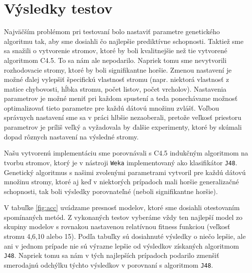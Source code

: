 \section{Výsledky testov}\label{kap5:Results}
Najväčším problémom pri testovaní bolo nastaviť parametre genetického algoritmu tak, aby sme dosiahli čo najlepšie prediktívne schopnosti. Taktiež sme sa snažili o vytvorenie stromov, ktoré by boli kvalitnejšie než tie vytvorené algoritmom C4.5. To sa nám ale nepodarilo. Napriek tomu sme nevytvorili rozhodovacie stromy, ktoré by boli signifikantne horšie. Zmenou nastavení je možné ďalej vylepšiť špecifickú vlastnosť stromu (napr. niektorá vlastnosť z matice chybovosti, hĺbka stromu, počet listov, počet vrcholov). Nastavenia parametrov je možné meniť pri každom spustení a teda ponechávame možnosť optimalizovať tieto parametre pre každú dátovú množinu zvlášť. Voľbou správnych nastavení sme sa v práci hlbšie nezaoberali, pretože veľkosť priestoru parametrov je príliš veľký a vyžadovala by ďalšie experimenty, ktoré by skúmali dopad rôznych nastavení na výsledné stromy.

Našu vytvorenú implementáciu sme porovnávali s C4.5 indukčným algoritmom na tvorbu stromov, ktorý je v nástroji \verb|Weka| implementovaný ako klasifikátor \verb|J48|. Genetický algoritmus s našimi zvolenými parametrami vytvoril pre každú dátovú množinu stromy, ktoré aj keď v niektorých prípadoch mali horšie generalizačné schopnosti, tak boli výsledky porovnateľné (neboli signifikantne horšie).

V tabuľke \ref{fig:acc} uvádzame presnosť modelov, ktoré sme dosiahli otestovaním spomínaných metód. Z vykonaných testov vyberáme vždy ten najlepší model zo skupiny modelov s rovnakou nastavenou relatívnou fitness funkciou (veľkosť stromu 4,6,10 alebo 15). Podľa tabuľky sú dosiahnuté výsledky o niečo lepšie, ale ani v jednom prípade nie sú výrazne lepšie od výsledkov získaných algoritmom \verb|J48|. Napriek tomu sa nám v tých najlepších prípadoch podarilo zmenšiť smerodajnú odchýlku týchto výsledkov v porovnaní s algoritmom \verb|J48|.

